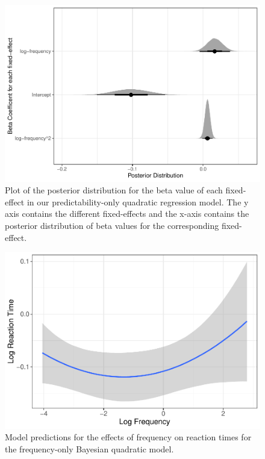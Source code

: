 \documentclass[
  man,floatsintext]{apa6}
\begin{document}
\begin{figure}

{\centering \includegraphics[width=0.8\linewidth]{write-up_files/figure-latex/PredicOnlyBetaPlot-1} 

}

\caption{Plot of the posterior distribution for the beta value of each fixed-effect in our predictability-only quadratic regression model. The y axis contains the different fixed-effects and the x-axis contains the posterior distribution of beta values for the corresponding fixed-effect.}\label{fig:PredicOnlyBetaPlot}
\end{figure}

\begin{figure}

{\centering \includegraphics[width=0.6\linewidth]{write-up_files/figure-latex/FreqOnlyPlot-1} 

}

\caption{Model predictions for the effects of frequency on reaction times for the frequency-only Bayesian quadratic model.}\label{fig:FreqOnlyPlot}
\end{figure}
\end{document}
